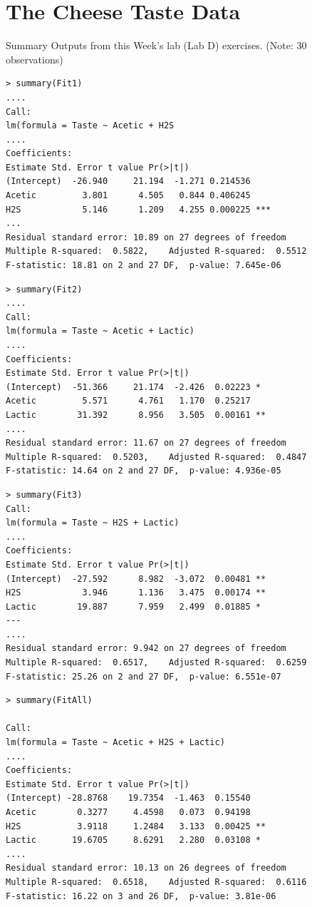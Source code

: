 \documentclass[a4paper,12pt]{article}
\begin{document}
\section{The Cheese Taste Data}
Summary Outputs from this Week's lab (Lab D) exercises. (Note: 30 observations)
\begin{framed}
\begin{verbatim}
> summary(Fit1)
....
Call:
lm(formula = Taste ~ Acetic + H2S
....
Coefficients:
Estimate Std. Error t value Pr(>|t|)    
(Intercept)  -26.940     21.194  -1.271 0.214536    
Acetic         3.801      4.505   0.844 0.406245    
H2S            5.146      1.209   4.255 0.000225 ***
...
Residual standard error: 10.89 on 27 degrees of freedom
Multiple R-squared:  0.5822,    Adjusted R-squared:  0.5512 
F-statistic: 18.81 on 2 and 27 DF,  p-value: 7.645e-06
\end{verbatim}
\end{framed}
\begin{framed}
\begin{verbatim}
> summary(Fit2)
....
Call:
lm(formula = Taste ~ Acetic + Lactic)
....
Coefficients:
Estimate Std. Error t value Pr(>|t|)   
(Intercept)  -51.366     21.174  -2.426  0.02223 * 
Acetic         5.571      4.761   1.170  0.25217   
Lactic        31.392      8.956   3.505  0.00161 **
....
Residual standard error: 11.67 on 27 degrees of freedom
Multiple R-squared:  0.5203,    Adjusted R-squared:  0.4847 
F-statistic: 14.64 on 2 and 27 DF,  p-value: 4.936e-05
\end{verbatim}
\end{framed}
\begin{framed}
\begin{verbatim}
> summary(Fit3)
Call:
lm(formula = Taste ~ H2S + Lactic)
....
Coefficients:
Estimate Std. Error t value Pr(>|t|)   
(Intercept)  -27.592      8.982  -3.072  0.00481 **
H2S            3.946      1.136   3.475  0.00174 **
Lactic        19.887      7.959   2.499  0.01885 * 
---
....
Residual standard error: 9.942 on 27 degrees of freedom
Multiple R-squared:  0.6517,    Adjusted R-squared:  0.6259 
F-statistic: 25.26 on 2 and 27 DF,  p-value: 6.551e-07
\end{verbatim}
\end{framed}
\begin{framed}
	\begin{verbatim}
> summary(FitAll)

Call:
lm(formula = Taste ~ Acetic + H2S + Lactic)
....
Coefficients:
Estimate Std. Error t value Pr(>|t|)   
(Intercept) -28.8768    19.7354  -1.463  0.15540   
Acetic        0.3277     4.4598   0.073  0.94198   
H2S           3.9118     1.2484   3.133  0.00425 **
Lactic       19.6705     8.6291   2.280  0.03108 * 
....
Residual standard error: 10.13 on 26 degrees of freedom
Multiple R-squared:  0.6518,    Adjusted R-squared:  0.6116 
F-statistic: 16.22 on 3 and 26 DF,  p-value: 3.81e-06
	\end{verbatim}
\end{framed}
\end{document}
